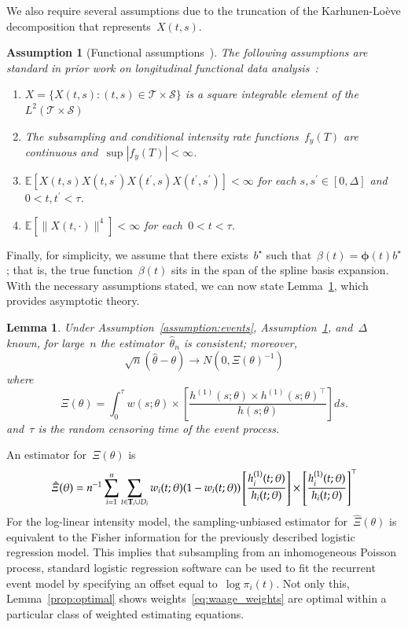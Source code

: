 \documentclass[12pt]{amsart}
\def\E{\mathcal{E}}
\newtheorem{lemma}[thm]{Lemma}
\newtheorem{assumption}[thm]{Assumption}
\def\E{\mathbb{E}}
\def\bfT{{\bf T}}
\begin{document}
We also require several assumptions due to the truncation of the Karhunen-Lo{\`e}ve decomposition that represents~$X(t,s)$.
\begin{assumption}[Functional assumptions~\citep{Park2018}] \normalfont
\label{assumption:truncation}
The following assumptions are standard in prior work on longitudinal functional data analysis~\citep{Park2018, Yao2005, ChenMuller2012}:
\begin{enumerate}[label=(A.\arabic*)]
\item\label{A1} $X = \{ X(t, s) : (t,s) \in \mathcal{T} \times
  \mathcal{S} \}$ is a square integrable element of the $L^2 (
  \mathcal{T} \times \mathcal{S})$
\item\label{A2} The subsampling and conditional intensity rate functions~$f_y(T)$ are continuous and~$\sup |f_y(T)| < \infty$.
\item\label{A3} $\E[X(t,s) X(t,s^\prime) X(t^\prime,s) X(t^\prime, s^\prime) ] < \infty$ for each $s,s^\prime \in [0,\Delta]$ and~$0 < t, t^\prime < \tau$.
\item\label{A4} $\E[\|X(t,\cdot)\|^4] < \infty$ for each~$0< t < \tau$.
\end{enumerate}
\end{assumption}
Finally, for simplicity, we assume that there exists~$b^\star$ such that~$\beta(t) = \mathbold{\phi} (t) b^\star$; that is, the true function~$\beta(t)$ sits in the span of the spline basis expansion. With the necessary assumptions stated, we can now state Lemma~\ref{lemma:simpleasym}, which provides asymptotic theory.

\begin{lemma} \normalfont
\label{lemma:simpleasym}
Under Assumption~\ref{assumption:events}, Assumption~\ref{assumption:truncation}, and~$\Delta$ known, for large~$n$ the estimator~$\hat \theta_n$ is consistent; moreover,
\[
\sqrt{n} (\hat \theta - \theta) \to N(0, \Xi (\theta)^{-1})
\]
where
\[
  \Xi (\theta) = \int_{0}^{\tau} w(s; \theta) \times \left[ \frac{h^{(1)}(s;
      \theta) \times  h^{(1)} (s;\theta)^{\top}}{h(s; \theta)} \right]
  ds.
\]
and~$\tau$ is the random censoring time of the event process.
\end{lemma}
An estimator for~$\Xi(\theta)$ is
\begin{equation}
\label{eq:fisher}
  \hat \Xi (\theta) = n^{-1} \sum_{i=1}^n \sum_{t \in \bfT_i \cup D_i}
  w_i(t;\theta) (1-w_i(t;\theta)) \left[ \frac{h_i^{(1)}(t;
      \theta)}{h_i (t; \theta)} \right] \times  \left [
    \frac{h_i^{(1)} (t;\theta)}{h_i(t; \theta)} \right]^\top
\end{equation}
For the log-linear intensity model, the sampling-unbiased estimator for~$\hat \Xi(\theta)$ is equivalent to the Fisher information for the previously described logistic regression model.
This implies that subsampling from an inhomogeneous Poisson process, standard logistic regression software can be used to fit the recurrent event model by specifying an offset equal to~$\log \pi_i (t)$. Not only this, Lemma~\ref{prop:optimal} shows weights~\eqref{eq:waage_weights} are optimal within a particular class of weighted estimating equations.
\end{document}
